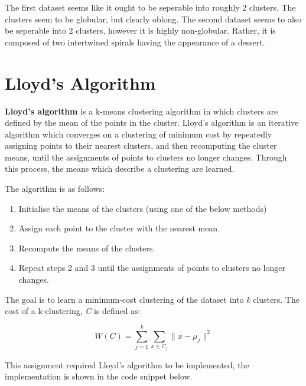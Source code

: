 \documentclass[12pt]{article}
\begin{document}
The first dataset seems like it ought to be seperable into roughly 2 clusters.
The clusters seem to be globular, but clearly oblong. The second dataset
seems to also be seperable into 2 clusters, however it is highly non-globular.
Rather, it is composed of two intertwined spirals having the appearance of a
dessert.

\section{Lloyd's Algorithm}

\textbf{Lloyd's algorithm} is a k-means clustering algorithm in which 
clusters are defined by the mean of the points in the cluster. Lloyd's algorithm 
is an iterative algorithm which converges on a clustering of minimum cost by 
repeatedly assigning points to their nearest clusters, and then recomputing the
cluster means, until the assignments of points to clusters no longer changes.
Through this process, the means which describe a clustering are learned. 

The algorithm is as follows:

\begin{enumerate}
    \item Initialise the means of the clusters (using one of the below methods)
    \item Assign each point to the cluster with the nearest mean.
    \item Recompute the means of the clusters.
    \item Repeat steps 2 and 3 until the assignments of points to clusters no
    longer changes.
\end{enumerate}

The goal is to learn a minimum-cost clustering of the dataset into \textit{k}
clusters. The cost of a k-clustering, \textit{C} is defined as:

\begin{equation}
    W(C) = \sum_{j=1}^{k} \sum_{x \in C_j} \lVert x - \mu_j \rVert^2
\end{equation}

This assignment required Lloyd's algorithm to be implemented, the implementation
is shown in the code snippet below.
\end{document}
